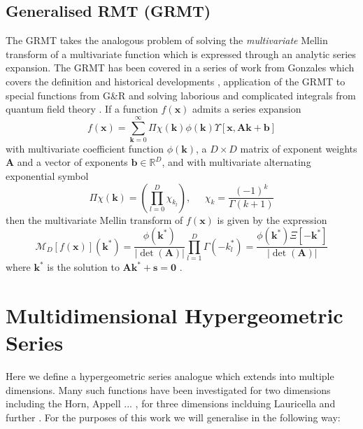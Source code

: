 \documentclass[journal=jcisd8,manuscript=article,layout=onecolumn,pdftex,floatfix,amsmath,amssymb,10pt]{achemso}
\begin{document}
\subsection{Generalised RMT (GRMT)}
The GRMT takes the analogous problem of solving the \emph{multivariate} Mellin transform of a multivariate function which is expressed through an analytic series expansion. The GRMT has been covered in a series of work from {\color{red}Gonzales} which covers the definition and historical developments \cite{}, application of the GRMT to special functions from G\&R \cite{...,..,...} and solving laborious and complicated integrals from quantum field theory \cite{}. If a function $f(\mathbf{x})$ admits a series expansion \begin{equation}
f(\mathbf{x}) = \sum_{\mathbf{k}=0}^\infty \Pi\chi(\mathbf{k}) \phi(\mathbf{k}) \Upsilon[\mathbf{x},\mathbf{A}\mathbf{k} + \mathbf{b}]
\end{equation}
with multivariate coefficient function $\phi(\mathbf{k})$, a $D\times D$ matrix of exponent weights $\mathbf{A}$ and a vector of exponents $\mathbf{b} \in \mathbb{R}^D$, and with multivariate alternating exponential symbol
\begin{equation}
\Pi\chi(\mathbf{k}) = \left(\prod_{l=0}^D \chi_{k_l}\right),\;\;\;\;\; \chi_k = \frac{(-1)^k}{\Gamma(k+1)}
\end{equation}
then the multivariate Mellin transform of $f(\mathbf{x})$ is given by the expression \begin{equation}
\mathcal{M}_D[f(\mathbf{x})](\mathbf{k}^*) = \frac{\phi(\mathbf{k}^*)}{|\det(\mathbf{A})|} \prod_{l=1}^D \Gamma(-k_l^*) = \frac{\phi(\mathbf{k}^*)\Xi[-\mathbf{k}^*]}{|\det(\mathbf{A})|}
\end{equation}
where $\mathbf{k}^*$ is the solution to $\mathbf{A}\mathbf{k^*}+\mathbf{s}=\mathbf{0}$ \cite{}.

\section{Multidimensional Hypergeometric Series}
Here we define a hypergeometric series analogue which extends into multiple dimensions. Many such functions have been investigated for two dimensions including the Horn, Appell ... \cite{}, for three dimensions inclduing Lauricella \cite{} and further \cite{}. For the purposes of this work we will generalise in the following way:
\end{document}
